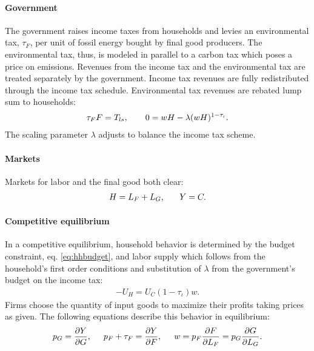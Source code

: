\paragraph{Government}
The government raises income taxes from households and levies an environmental tax, $\tau_F$, per unit of fossil energy bought by final good producers. The environmental tax, thus, is modeled in parallel to a carbon tax which poses a price on emissions. Revenues from the income tax and the environmental tax are treated separately by the government. Income tax revenues are fully redistributed through the income tax schedule. Environmental tax revenues are rebated lump sum to households:
\begin{align}
\tau_{F}F=T_{ls}, \hspace{7mm}
0={w H}-\lambda(w H)^{1-\tau_{\iota}}. \label{eq:gov_but}
\end{align}
The scaling parameter $\lambda$ adjusts to balance the income tax scheme. 

\paragraph{Markets}
Markets for labor and the final good both clear: 
\begin{align}
H=L_F+L_G,\ \hspace{5mm} Y=C. \label{eq:market_clear}
\end{align}
\paragraph{Competitive equilibrium}
In a competitive equilibrium, household behavior is determined by the budget constraint, eq. \eqref{eq:hhbudget}, and labor supply which follows from the household's first order conditions and substitution of $\lambda$ from the government's budget on the income tax:
\begin{align}
-U_H=U_C(1-\tau_{\iota})w. \label{eq:hsup}
\end{align}
Firms choose the quantity of input goods to maximize their profits taking prices as given. The following equations describe this behavior in equilibrium:
\begin{align}
p_G=\frac{\partial Y}{\partial G}, \hspace{5mm}
p_F +\tau_{F} = \frac{\partial Y}{\partial F}, \hspace{5mm}
w= p_F\frac{\partial F}{\partial L_F}=p_G\frac{\partial G}{\partial L_G}.\label{eq:profmax}
\end{align}

